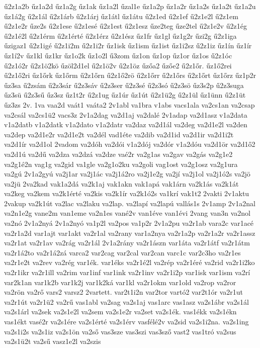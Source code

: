 {ű2z1a2b
űz1a2d
űz1a2g
űz1ak
űz1a2l
űzal1e
űz1a2p
űz1a2r
űz1a2s
űz1a2t
űz1a2u
űz1á2g
ű2z1ál
ű2z1árb
ű2z1árj
űz1átl
űz1átu
ű2z1ed
ű2z1ef
ű2z1e2l
ű2z1em
ű2z1e2r
űze2s
ű2z1ese
ű2z1esé
ű2z1est
ű2z1esz
űze2teg
űze2tel
ű2z1e2v
ű2z1ég
ű2z1é2l
ű2z1érm
ű2z1érté
ű2z1érz
ű2z1ész
űz1fr
űz1gl
űz1g2r
űzi2g
ű2z1iga
űzigaz1
ű2z1igé
ű2z1i2m
ű2z1i2r
űz1isk
űz1ism
űz1ist
űz1i2sz
ű2z1iz
űz1ín
űz1ír
űz1í2v
űz1kl
űz1kr
űz1o2k
űz1o2l
ű3zom
űz1on
űz1op
űz1or
űz1os
ű2z1óc
ű2z1ó2r
ű2z1ö2kö
űzöl2d1el
ű2z1ö2v
ű2z1öz
űzőa2
űzőe2
ű2z1őr.
űz1ő2rei
ű2z1ő2ri
űz1őrk
űz1őrm
ű2z1őrn
ű2z1ő2rö
ű2z1őrr
ű2z1őrs
ű2z1őrt
űz1őrz
űz1p2r
űz3sa
ű2zsám
ű2z3sár
ű2z3sáv
ű2z3ser
ű2z3sé
ű2z3só
ű2z3sö
űz3s2p
ű2z3suga
űz3sü
ű2z3sű
űz3sz
űz1t2r
ű2z1ug
űz1úr
űz1út
ű2z1ü2g
ű2z1ül
űz1ünn
ű2z1üt
űz3zs
2v.
1va
vaa2d
vaát1
vaáta2
2v1abl
va1bra
v1abs
vacs1ala
va2cs1an
va2csap
va2csál
va2cs1ü2
vacs3z
2v1a2dag
va2d1aj
va2dalé
2v1adap
va2d1asz
v1a2data
v1a2datb
v1a2datk
v1a2dato
v1a2datr
va2daz
va2d1ál
va2deg
va2d1e2l
va2den
va2dep
va2d1e2r
va2d1e2t
va2dél
vad1éte
va2dib
va2d1id
va2d1ir
va2d1i2t
va2d1ír
va2d1ol
2vadom
va2dóh
va2dói
v1a2dój
va2dór
v1a2dóu
va2d1ör
va2d1ő2
va2d1ú
va2dű
va2dza
va2dzá
va2dze
vaé2r
va2g1as
va2gav
va2gás
va2g1e2
va2g1é2n
vag1g
va2gid
va1gle
va2g1o2ku
va2goli
vag1ost
va2g1osz
va2g1ura
va2gú
2v1a2gyú
va2j1ar
va2j1ác
va2j1á2ro
va2j1e2g
va2jí
va2j1ol
va2j1ó2s
va2jö
va2jü
2va2kad
vak1a2dá
va2k1aj
vak1akn
vak1apá
vak1árn
va2k1ás
va2k1át
va2keg
va2kem
va2k1érté
va2kis
va2k1ír
va2k1ó2s
va1krí
vak1t2
2vakti
2v1aktu
2vakup
va2k1út
va2lac
va2laku
va2lap.
va2lapí
va2lapú
vallás1s
2v1amp
2v1a2nal
va2n1e2g
vane2m
van1eme
va2n1es
vané2v
van1éve
van1évi
2vang
van3n
va2nol
va2nó
2v1a2nyá
2v1a2nyó
va1p2l
va2pos
va1p2r
2v1a2pu
va2r1ab
vara2c
var1acé
va2r1a2d
var1ajt
var1akt
va2r1al
va2rany
var1a2nya
va2r1a2p
va2r1a2r
va2r1assz
va2r1at
va2r1av
va2rág
va2r1ál
2v1a2rány
va2r1ászn
var1áta
va2r1átf
va2r1átm
va2r1á2to
va2r1á2zá
varca2
var2cag
var2cal
var2can
varc1c
var2c3ho
va2r1es
va2r1e2t
va2rev
va2rég
var1ék.
var1éks
va2r1é2l
va2rép
va2r1éré
va2rid
va2r1i2ko
va2r1ikr
va2r1ill
va2rim
var1inf
var1ink
va2r1inv
va2r1i2p
var1isk
var1ism
va2rí
var2k1an
var1k2b
var1k2j
var1k2ká
var1kl
va2r1okm
var1old
va2rop
va2ror
va2rön
va2rő
vars2
varsz2
2vartett.
var2t1i2n
var2tor
vartó2
var2t1ór
va2r1ut
va2r1út
va2r1ü2
va2rű
vas1abl
va2sag
va2s1aj
vas1arc
vas1asz
va2s1ábr
va2s1ál
va2s1árl
va2sek
va2s1e2l
va2sem
va2s1e2r
va2set
va2s1ék.
vas1ékk
va2s1ékn
vas1ékt
vasé2r
va2s1ére
va2s1érté
va2s1érv
vasfélé2v
va2sid
va2s1i2na.
va2s1ing
va2s1i2s
va2s1iz
va2s1ön
va2ső
vas3sze
vas3szi
vas3sző
vast2
vas1tró
va2sus
va2s1ü2t
va2sű
vasz1e2l
va2szis
}
